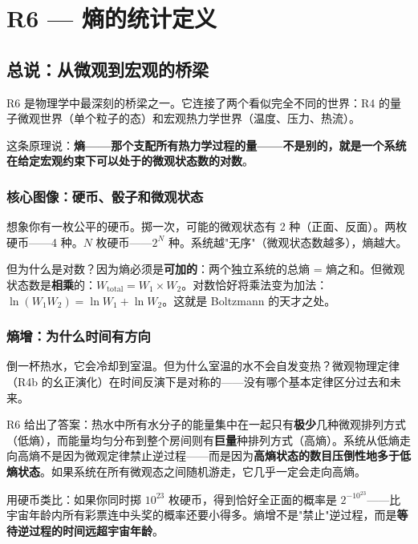 \chapter{R6 — 熵的统计定义}
\label{ch:r6}

\section{总说：从微观到宏观的桥梁}

R6 是物理学中最深刻的桥梁之一。它连接了两个看似完全不同的世界：R4 的量子微观世界（单个粒子的态）和宏观热力学世界（温度、压力、热流）。

这条原理说：\textbf{熵——那个支配所有热力学过程的量——不是别的，就是一个系统在给定宏观约束下可以处于的微观状态数的对数}。

\subsection{核心图像：硬币、骰子和微观状态}

想象你有一枚公平的硬币。掷一次，可能的微观状态有 2 种（正面、反面）。两枚硬币——4 种。$N$ 枚硬币——$2^N$ 种。系统越"无序"（微观状态数越多），熵越大。

但为什么是对数？因为熵必须是\textbf{可加的}：两个独立系统的总熵 = 熵之和。但微观状态数是\textbf{相乘}的：$W_{\text{total}} = W_1 \times W_2$。对数恰好将乘法变为加法：$\ln(W_1 W_2) = \ln W_1 + \ln W_2$。这就是 Boltzmann 的天才之处。

\subsection{熵增：为什么时间有方向}

倒一杯热水，它会冷却到室温。但为什么室温的水不会自发变热？微观物理定律（R4b 的幺正演化）在时间反演下是对称的——没有哪个基本定律区分过去和未来。

R6 给出了答案：热水中所有水分子的能量集中在一起只有\textbf{极少}几种微观排列方式（低熵），而能量均匀分布到整个房间则有\textbf{巨量}种排列方式（高熵）。系统从低熵走向高熵不是因为微观定律禁止逆过程——而是因为\textbf{高熵状态的数目压倒性地多于低熵状态}。如果系统在所有微观态之间随机游走，它几乎一定会走向高熵。

用硬币类比：如果你同时掷 $10^{23}$ 枚硬币，得到恰好全正面的概率是 $2^{-10^{23}}$——比宇宙年龄内所有彩票连中头奖的概率还要小得多。熵增不是"禁止"逆过程，而是\textbf{等待逆过程的时间远超宇宙年龄}。

